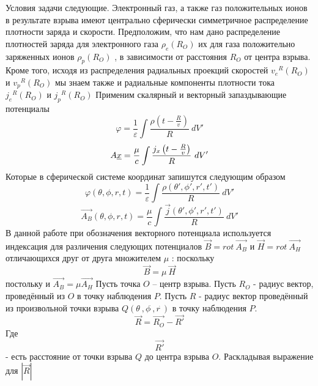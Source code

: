 \documentclass[11pt]{article}
\begin{document}
Условия задачи следующие.
Электронный газ, а также газ положительных ионов в результате взрыва
имеют центрально сферически симметричное распределение плотности заряда
и скорости. Предположим, что нам дано распределение плотностей заряда
для электронного газа \({{\rho }_{e}}\left( {{R}_{O}} \right)\) их для
газа положительно заряженных ионов
\({{\rho }_{p}}\left( {{R}_{O}} \right)\) , в зависимости от расстояния
\({{R}_{O}}\) от центра взрыва. Кроме того, исходя из распределения
радиальных проекций скоростей \({{v}_{e}}^{R}\left( {{R}_{O}} \right)\)
и \({{v}_{p}}^{R}\left( {{R}_{O}} \right)\) мы знаем также и радиальные
компоненты плотности тока \({{j}_{e}}^{R}\left( {{R}_{O}} \right)\) и
\({{j}_{p}}^{R}\left( {{R}_{O}} \right)\) Применим скалярный и векторный
запаздывающие потенциалы
\begin{equation}
\varphi =\frac{1}{\varepsilon }\int{\frac{\rho \left( t-\frac{R}{v} \right)}{R}}~dV'
\end{equation}
\begin{equation}
{A}\emph{{x}}=\frac{\mu}{c}\int{\frac{{{j}_{x}}\left( t-\frac{R}{v} \right)}{R}}~dV'
\end{equation}
Которые в сферической системе координат запишутся следующим образом
\begin{equation}\varphi \left( \theta ,\phi ,r,t
\right)=\frac{1}{\varepsilon }\int{\frac{\rho \left( \theta ',\phi ',r',t' \right)}{R}}~dV'\end{equation}
\begin{equation}\overrightarrow{{{A}_{B}}}\left( \theta ,\phi ,r,t
\right)=\frac{\mu }{c}\int{\frac{\overrightarrow{j}\left( \theta ',\phi ',r',t' \right)}{R}}~dV'\end{equation}
В данной работе при обозначения векторного потенциала используется
индексация для различения следующих потенциалов
\(\overrightarrow{B}=rot\ \overrightarrow{{{A}_{B}}}\) и
\(\overrightarrow{H}=rot\ \overrightarrow{{{A}_{H}}}\) отличающихся друг
от друга множителем $\mu $ : поскольку
\begin{equation}\overrightarrow{B}=\mu ~\overrightarrow{H}\end{equation} постольку и
\(\overrightarrow{{{A}_{B}}}=\mu \overrightarrow{{{A}_{H}}}\) Пусть
точка \(O\) -- центр взрыва. Пусть \({{R}_{O}}\) - радиус вектор,
проведённый из \(O\) в точку наблюдения \(P\). Пусть \(R\) - радиус
вектор проведённый из произвольной точки взрыва
\(Q\left( {{\theta }^{\grave{\ }}},{{\phi }^{\grave{\ }}},{{r}^{\grave{\ }}} \right)\)
в точку наблюдения \(P\).
\begin{equation}\overrightarrow{R}=\overrightarrow{{{R}_{O}}}-\overrightarrow{R'}\end{equation}
Где \begin{equation}\overrightarrow{R'}\end{equation} - есть расстояние от точки взрыва \(Q\) до
центра взрыва \(O\). Раскладывая выражение для \(|\overrightarrow{R}|\)
\end{document}
